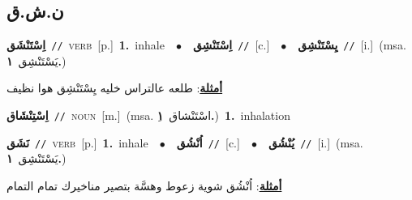 \documentclass[10pt,a4paper,twoside]{article} %
\begin{document}
\begin{multicols}{2}
\vspace{-3mm}
\subsection*{\color{blue}\foreignlanguage{arabic}{ن.ش.ق}\color{blue}{}} 

{\setlength\topsep{0pt}\textbf{\foreignlanguage{arabic}{اِسْتَنْشَق}}\ {\color{gray}\texttt{//}\color{black}}\ \textsc{verb}\ [p.]\ \textbf{1.}~inhale\ \ $\bullet$\ \ \setlength\topsep{0pt}\textbf{\foreignlanguage{arabic}{اِسْتَنْشِق}}\ {\color{gray}\texttt{//}\color{black}}\ [c.]\ \ $\bullet$\ \ \setlength\topsep{0pt}\textbf{\foreignlanguage{arabic}{يِسْتَنْشِق}}\ {\color{gray}\texttt{//}\color{black}}\ [i.]\ \color{gray}(msa. \foreignlanguage{arabic}{يَسْتَنْشِق}~\foreignlanguage{arabic}{\textbf{١.}})\color{black}\  \begin{flushright}\color{gray}\foreignlanguage{arabic}{\textbf{\underline{\foreignlanguage{arabic}{أمثلة}}}: طلعه عالتراس خليه يِسْتَنْشِق هوا نظيف}\end{flushright}\color{black}} \vspace{2mm}

{\setlength\topsep{0pt}\textbf{\foreignlanguage{arabic}{اِسْتِنْشَاق}}\ {\color{gray}\texttt{//}\color{black}}\ \textsc{noun}\ [m.]\ \color{gray}(msa. \foreignlanguage{arabic}{ِاسْتَنْشاق}~\foreignlanguage{arabic}{\textbf{١.}})\color{black}\ \textbf{1.}~inhalation\ } \vspace{2mm}

{\setlength\topsep{0pt}\textbf{\foreignlanguage{arabic}{نَشَق}}\ {\color{gray}\texttt{//}\color{black}}\ \textsc{verb}\ [p.]\ \textbf{1.}~inhale\ \ $\bullet$\ \ \setlength\topsep{0pt}\textbf{\foreignlanguage{arabic}{اُنْشُق}}\ {\color{gray}\texttt{//}\color{black}}\ [c.]\ \ $\bullet$\ \ \setlength\topsep{0pt}\textbf{\foreignlanguage{arabic}{يُنْشُق}}\ {\color{gray}\texttt{//}\color{black}}\ [i.]\ \color{gray}(msa. \foreignlanguage{arabic}{يَسْتَنْشِق}~\foreignlanguage{arabic}{\textbf{١.}})\color{black}\  \begin{flushright}\color{gray}\foreignlanguage{arabic}{\textbf{\underline{\foreignlanguage{arabic}{أمثلة}}}: اُنْشُق شوية زعوط وهسَّة بتصير مناخيرك تمام التمام}\end{flushright}\color{black}} \vspace{2mm}


\end{multicols}
\end{document}
